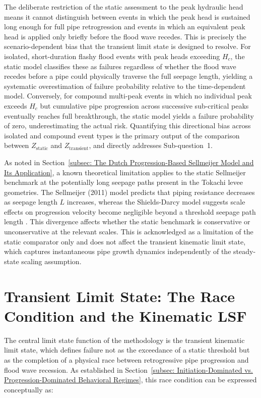 The deliberate restriction of the static assessment to the peak hydraulic head means it cannot distinguish between events in which the peak head is sustained long enough for full pipe retrogression and events in which an equivalent peak head is applied only briefly before the flood wave recedes. This is precisely the scenario-dependent bias that the transient limit state is designed to resolve. For isolated, short-duration flashy flood events with peak heads exceeding $H_c$, the static model classifies these as failures regardless of whether the flood wave recedes before a pipe could physically traverse the full seepage length, yielding a systematic overestimation of failure probability relative to the time-dependent model. Conversely, for compound multi-peak events in which no individual peak exceeds $H_c$ but cumulative pipe progression across successive sub-critical peaks eventually reaches full breakthrough, the static model yields a failure probability of zero, underestimating the actual risk. Quantifying this directional bias across isolated and compound event types is the primary output of the comparison between $Z_\mathrm{static}$ and $Z_\mathrm{transient}$, and directly addresses Sub-question~1.

As noted in Section~\ref{subsec: The Dutch Progression-Based Sellmeijer Model and Its Application}, a known theoretical limitation applies to the static Sellmeijer benchmark at the potentially long seepage paths present in the Tokachi levee geometries. The Sellmeijer (2011) model predicts that piping resistance decreases as seepage length $L$ increases, whereas the Shields-Darcy model suggests scale effects on progression velocity become negligible beyond a threshold seepage path length \parencite{van_beek_2015}. This divergence affects whether the static benchmark is conservative or unconservative at the relevant scales. This is acknowledged as a limitation of the static comparator only and does not affect the transient kinematic limit state, which captures instantaneous pipe growth dynamics independently of the steady-state scaling assumption.

\section{Transient Limit State: The Race Condition and the Kinematic LSF}
\label{sec: Transient Limit State: The Race Condition and the Kinematic LSF}

The central limit state function of the methodology is the transient kinematic limit state, which defines failure not as the exceedance of a static threshold but as the completion of a physical race between retrogressive pipe progression and flood wave recession. As established in Section~\ref{subsec: Initiation-Dominated vs. Progression-Dominated Behavioral Regimes}, this race condition can be expressed conceptually as:

